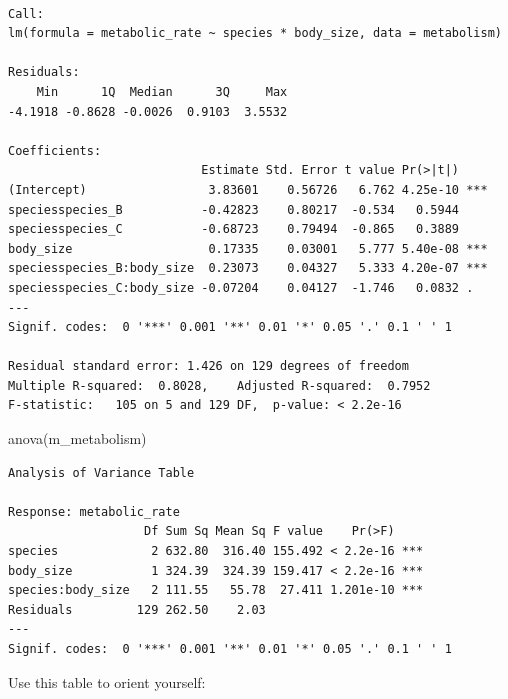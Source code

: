 \documentclass[
  letterpaper,
  8pt,
  a4paper]{book}
\newenvironment{Shaded}{\begin{snugshade}}{\end{snugshade}}
\newcommand{\FunctionTok}[1]{\textcolor[rgb]{0.28,0.35,0.67}{#1}}
\newcommand{\NormalTok}[1]{\textcolor[rgb]{0.00,0.23,0.31}{#1}}
\begin{document}
\begin{verbatim}

Call:
lm(formula = metabolic_rate ~ species * body_size, data = metabolism)

Residuals:
    Min      1Q  Median      3Q     Max 
-4.1918 -0.8628 -0.0026  0.9103  3.5532 

Coefficients:
                           Estimate Std. Error t value Pr(>|t|)    
(Intercept)                 3.83601    0.56726   6.762 4.25e-10 ***
speciesspecies_B           -0.42823    0.80217  -0.534   0.5944    
speciesspecies_C           -0.68723    0.79494  -0.865   0.3889    
body_size                   0.17335    0.03001   5.777 5.40e-08 ***
speciesspecies_B:body_size  0.23073    0.04327   5.333 4.20e-07 ***
speciesspecies_C:body_size -0.07204    0.04127  -1.746   0.0832 .  
---
Signif. codes:  0 '***' 0.001 '**' 0.01 '*' 0.05 '.' 0.1 ' ' 1

Residual standard error: 1.426 on 129 degrees of freedom
Multiple R-squared:  0.8028,    Adjusted R-squared:  0.7952 
F-statistic:   105 on 5 and 129 DF,  p-value: < 2.2e-16
\end{verbatim}

\begin{Shaded}
\begin{Highlighting}[]
\FunctionTok{anova}\NormalTok{(m\_metabolism)}
\end{Highlighting}
\end{Shaded}

\begin{verbatim}
Analysis of Variance Table

Response: metabolic_rate
                   Df Sum Sq Mean Sq F value    Pr(>F)    
species             2 632.80  316.40 155.492 < 2.2e-16 ***
body_size           1 324.39  324.39 159.417 < 2.2e-16 ***
species:body_size   2 111.55   55.78  27.411 1.201e-10 ***
Residuals         129 262.50    2.03                      
---
Signif. codes:  0 '***' 0.001 '**' 0.01 '*' 0.05 '.' 0.1 ' ' 1
\end{verbatim}

Use this table to orient yourself:
\end{document}
